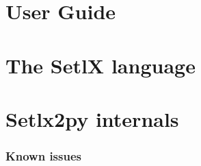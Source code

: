 \documentclass[a4paper,11pt]{article}
\begin{document}



\tableofcontents
\clearpage
\listoffigures
\printglossaries


\clearpage
\part{User Guide}







\clearpage
\part{The SetlX language}
\clearpage




\clearpage
\part{Setlx2py internals}
\clearpage







\section{Known issues}
\end{document}

